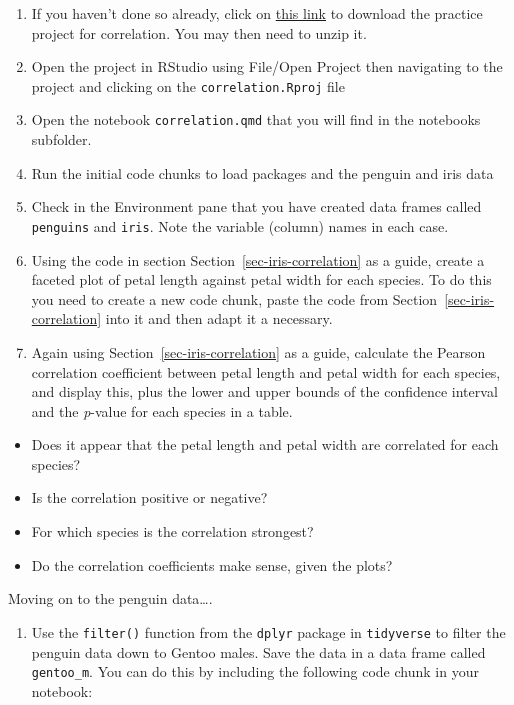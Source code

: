 \documentclass[
  letterpaper,
  DIV=11,
  numbers=noendperiod]{scrreprt}
\providecommand{\tightlist}{%
  \setlength{\itemsep}{0pt}\setlength{\parskip}{0pt}}\usepackage{longtable,booktabs,array}
\begin{document}
\begin{enumerate}
\def\labelenumi{\arabic{enumi}.}
\item
  If you haven't done so already, click on
  \href{https://github.com/mbh038/correlation/archive/refs/heads/main.zip}{this
  link} to download the practice project for correlation. You may then
  need to unzip it.
\item
  Open the project in RStudio using File/Open Project then navigating to
  the project and clicking on the \texttt{correlation.Rproj} file
\item
  Open the notebook \texttt{correlation.qmd} that you will find in the
  notebooks subfolder.
\item
  Run the initial code chunks to load packages and the penguin and iris
  data
\item
  Check in the Environment pane that you have created data frames called
  \texttt{penguins} and \texttt{iris}. Note the variable (column) names
  in each case.
\item
  Using the code in section Section~\ref{sec-iris-correlation} as a
  guide, create a faceted plot of petal length against petal width for
  each species. To do this you need to create a new code chunk, paste
  the code from Section~\ref{sec-iris-correlation} into it and then
  adapt it a necessary.
\item
  Again using Section~\ref{sec-iris-correlation} as a guide, calculate
  the Pearson correlation coefficient between petal length and petal
  width for each species, and display this, plus the lower and upper
  bounds of the confidence interval and the \emph{p}-value for each
  species in a table.
\end{enumerate}

\begin{itemize}
\tightlist
\item
  Does it appear that the petal length and petal width are correlated
  for each species?\\
\item
  Is the correlation positive or negative?\\
\item
  For which species is the correlation strongest?\\
\item
  Do the correlation coefficients make sense, given the plots?
\end{itemize}

Moving on to the penguin data\ldots.

\begin{enumerate}
\def\labelenumi{\arabic{enumi}.}
\setcounter{enumi}{7}
\tightlist
\item
  Use the \texttt{filter()} function from the \texttt{dplyr} package in
  \texttt{tidyverse} to filter the penguin data down to Gentoo males.
  Save the data in a data frame called \texttt{gentoo\_m}. You can do
  this by including the following code chunk in your notebook:
\end{enumerate}
\end{document}
